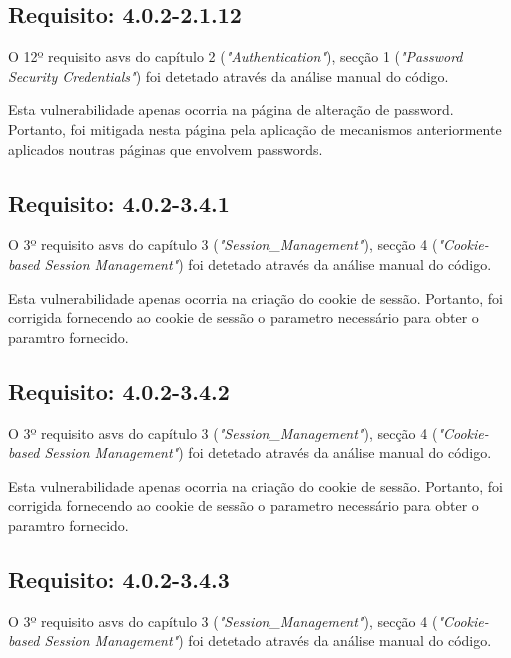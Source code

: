 \subsection*{Requisito: 4.0.2-2.1.12}
O 12º requisito \ac{asvs} do capítulo 2 (\textit{"Authentication"}), secção 1  (\textit{"Password Security Credentials"}) foi detetado através da análise manual do código.

Esta vulnerabilidade apenas ocorria na página de alteração de password. Portanto, foi mitigada nesta página pela aplicação de mecanismos anteriormente aplicados noutras páginas que envolvem passwords.

\subsection*{Requisito: 4.0.2-3.4.1}

O 3º requisito \ac{asvs} do capítulo 3 (\textit{"Session\_Management"}), secção 4  (\textit{"Cookie-based Session Management"}) foi detetado através da análise manual do código.

Esta vulnerabilidade apenas ocorria na criação do cookie de sessão. Portanto, foi corrigida fornecendo ao cookie de sessão o parametro necessário para obter o paramtro fornecido.

\subsection*{Requisito: 4.0.2-3.4.2}

O 3º requisito \ac{asvs} do capítulo 3 (\textit{"Session\_Management"}), secção 4  (\textit{"Cookie-based Session Management"}) foi detetado através da análise manual do código.

Esta vulnerabilidade apenas ocorria na criação do cookie de sessão. Portanto, foi corrigida fornecendo ao cookie de sessão o parametro necessário para obter o paramtro fornecido.

\subsection*{Requisito: 4.0.2-3.4.3}

O 3º requisito \ac{asvs} do capítulo 3 (\textit{"Session\_Management"}), secção 4  (\textit{"Cookie-based Session Management"}) foi detetado através da análise manual do código.

